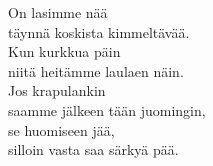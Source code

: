 
            On lasimme nää \\
            täynnä koskista kimmeltävää. \\
            Kun kurkkua päin \\
            niitä heitämme laulaen näin. \\
            Jos krapulankin \\
            saamme jälkeen tään juomingin, \\
            se huomiseen jää, \\
            silloin vasta saa särkyä pää. \\
